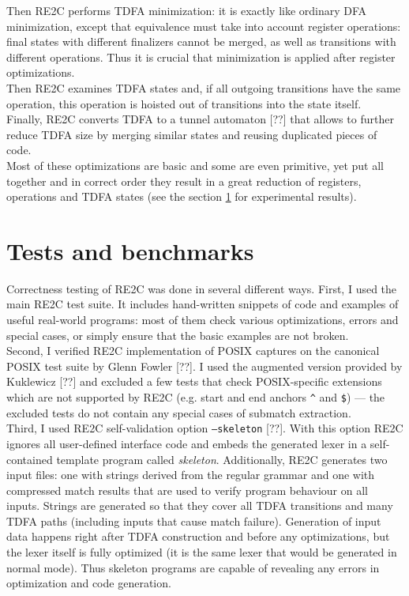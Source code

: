 \documentclass{article}
\theoremstyle{definition}
\begin{document}
\begin{multicols}{2}
Then RE2C performs TDFA minimization:
it is exactly like ordinary DFA minimization, except that
equivalence must take into account register operations:
final states with different finalizers cannot be merged, as well as transitions with different operations.
Thus it is crucial that minimization is applied after register optimizations.
\\

Then RE2C examines TDFA states and, if all outgoing transitions have the same operation,
this operation is hoisted out of transitions into the state itself.
\\

Finally, RE2C converts TDFA to a tunnel automaton [??]
that allows to further reduce TDFA size by merging similar states and reusing duplicated pieces of code.
\\

Most of these optimizations are basic and some are even primitive, yet put all together and in correct order
they result in a great reduction of registers, operations and TDFA states
(see the section \ref{section_tests_and_benchmarks} for experimental results).

\section{Tests and benchmarks}\label{section_tests_and_benchmarks}

Correctness testing of RE2C was done in several different ways.
First, I used the main RE2C test suite. It includes hand-written snippets of code and examples of useful real-world programs:
most of them check various optimizations, errors and special cases,
or simply ensure that the basic examples are not broken.
\\

Second, I verified RE2C implementation of POSIX captures on the canonical POSIX test suite by Glenn Fowler [??].
I used the augmented version provided by Kuklewicz [??] and excluded a few tests that check POSIX-specific extensions
which are not supported by RE2C (e.g. start and end anchors \texttt{\^} and \texttt{\$}) ---
the excluded tests do not contain any special cases of submatch extraction.
\\

Third, I used RE2C self-validation option \texttt{--skeleton} [??].
With this option RE2C ignores all user-defined interface code
and embeds the generated lexer in a self-contained template program called \emph{skeleton}.
Additionally, RE2C generates two input files: one with strings derived from the regular grammar
and one with compressed match results that are used to verify program behaviour on all inputs.
Strings are generated so that they cover all TDFA transitions and many TDFA paths (including inputs that cause match failure).
Generation of input data happens right after TDFA construction and before any optimizations,
but the lexer itself is fully optimized (it is the same lexer that would be generated in normal mode).
Thus skeleton programs are capable of revealing any errors in optimization and code generation.
\\


\end{multicols}
\end{document}
